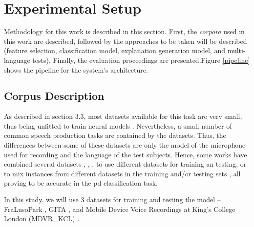 
\chapter{Experimental Setup}
\label{ch:adipisci}



Methodology for this work is described in this section. First, the \textit{corpora} used in this work are described, followed by the approaches to be taken will be described (feature selection, classification model, explanation generation model, and multi-language tests). Finally, the evaluation proceedings are presented.Figure \ref{pipeline} shows the pipeline for the system's architecture. 

\section{Corpus Description}

As described in section 3.3, most datasets available for this task are very small, thus being unfitted to train neural models \cite{underfitting_small_datasets}. Nevertheless, a small number of common speech production tasks are contained by the datasets. Thus, the differences between some of these datasets are only the model of the microphone used for recording and the language of the test subjects. Hence, some works have combined several datasets \cite{parkinson_braga}, \cite{parkinson_acoustic_despotovic}, \cite{parkinson_phonemic_relevance}, \cite{x_vector_parkinson} to use different datasets for training an testing, or to mix instances from different datasets in the training and/or testing sets \cite{parkinson_three_languages}, all proving to be accurate in the \gls{pd} classification task.

In this study, we will use 3 datasets for training and testing the model -- FraLusoPark \cite{fralusopark}, GITA \cite{GITA}, and Mobile Device Voice Recordings at King's College London (MDVR\_KCL) \cite{MDVR}.

